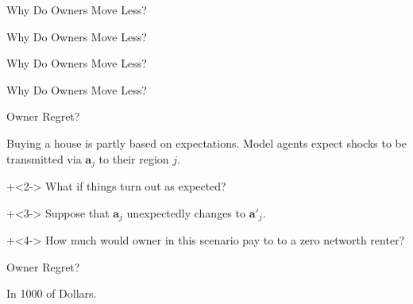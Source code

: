 \documentclass[12pt,english, aspectratio=169]{beamer}
\begin{document}
\begin{frame}{Why Do Owners Move Less?}

\begin{table}
\centering{}
\end{table}
\end{frame}

\begin{frame}{Why Do Owners Move Less?}

\begin{table}
\centering{}
\end{table}
\end{frame}

\begin{frame}{Why Do Owners Move Less?}

\begin{table}
\centering{}
\end{table}
\end{frame}

\begin{frame}{Why Do Owners Move Less?}

\begin{table}
\centering{}
\end{table}
\end{frame}

\begin{frame}{Owner Regret?}
\begin{midi}
\item Buying a house is partly based on expectations. Model agents expect  shocks to be transmitted via $\mathbf{a}_j$ to their region $j$.
\item \onslide+<2-> What if things turn out  as expected?
\item \onslide+<3-> Suppose that $\mathbf{a}_j$ unexpectedly changes to $\mathbf{a'}_j$.
\item \onslide+<4-> How much would owner in this  scenario pay to  to a zero networth renter? 
\end{midi}

\end{frame}

\begin{frame}{Owner Regret?}


\begin{table}
\begin{adjustbox}{center}

\end{adjustbox}
\caption{In 1000 of Dollars.}
\end{table}
\end{frame}
\end{document}
